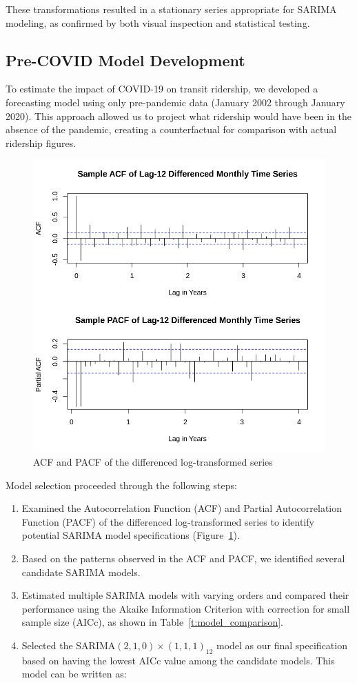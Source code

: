\documentclass[11pt]{article}
\begin{document}
These transformations resulted in a stationary series appropriate for SARIMA modeling, as confirmed by both visual inspection and statistical testing.

\subsection{Pre-COVID Model Development}

To estimate the impact of COVID-19 on transit ridership, we developed a forecasting model using only pre-pandemic data (January 2002 through January 2020). This approach allowed us to project what ridership would have been in the absence of the pandemic, creating a counterfactual for comparison with actual ridership figures.

\begin{figure}[!ht]
\centering
\includegraphics[width=0.525\linewidth]{diff_acf_pacf.png}
\caption{ACF and PACF of the differenced log-transformed series}
\label{f:acf_pacf_diff}
\end{figure}

Model selection proceeded through the following steps:

\begin{enumerate}
  \item Examined the Autocorrelation Function (ACF) and Partial Autocorrelation Function (PACF) of the differenced log-transformed series to identify potential SARIMA model specifications (Figure~\ref{f:acf_pacf_diff}).
  
  \item Based on the patterns observed in the ACF and PACF, we identified several candidate SARIMA models.
  
  \item Estimated multiple SARIMA models with varying orders and compared their performance using the Akaike Information Criterion with correction for small sample size (AICc), as shown in Table~\ref{t:model_comparison}.
  
  \item Selected the SARIMA$(2,1,0)\times(1,1,1)_{12}$ model as our final specification based on having the lowest AICc value among the candidate models. This model can be written as:
\end{enumerate}
\end{document}
